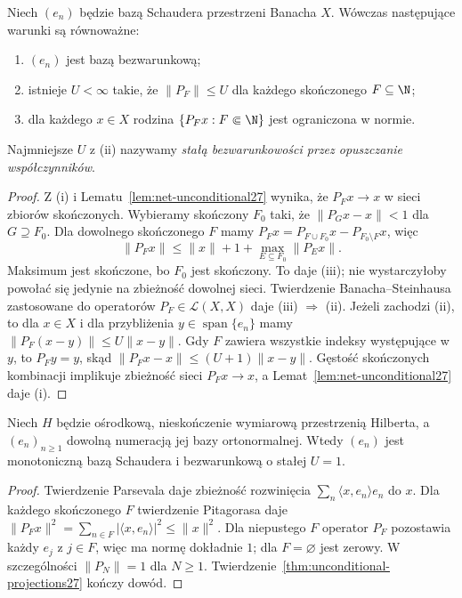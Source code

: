 \begin{twierdzenie}
\label{thm:unconditional-projections27}
Niech $(e_n)$ będzie bazą Schaudera przestrzeni Banacha $X$.
Wówczas następujące warunki są równoważne:
\begin{enumerate}[label=\textup{(\roman*)}]
\item $(e_n)$ jest bazą bezwarunkową;
\item istnieje $U<\infty$ takie, że $\|P_F\|\le U$
 dla każdego skończonego $F\subseteq\N$;
\item dla każdego $x\in X$ rodzina
$\{P_Fx:F\Subset\N\}$ jest ograniczona w normie.
\end{enumerate}
Najmniejsze $U$ z (ii) nazywamy \emph{stałą bezwarunkowości
przez opuszczanie współczynników}.
\end{twierdzenie}
\begin{proof}
Z (i) i Lematu~\ref{lem:net-unconditional27} wynika, że
$P_Fx\to x$ w sieci zbiorów skończonych. Wybieramy skończony
$F_0$ taki, że $\|P_Gx-x\|<1$ dla $G\supseteq F_0$.
Dla dowolnego skończonego $F$ mamy
$P_Fx=P_{F\cup F_0}x-P_{F_0\setminus F}x$,
więc
\[
\|P_Fx\|\le \|x\|+1+\max_{E\subseteq F_0}\|P_Ex\|.
\]
Maksimum jest skończone, bo $F_0$ jest skończony.
To daje (iii); nie wystarczyłoby powołać się jedynie na
zbieżność dowolnej sieci.
Twierdzenie Banacha--Steinhausa zastosowane do operatorów
$P_F\in\mathcal L(X,X)$ daje (iii) $\Rightarrow$ (ii).
Jeżeli zachodzi (ii), to dla $x\in X$ i dla przybliżenia
$y\in\operatorname{span}\{e_n\}$ mamy
$\|P_F(x-y)\|\le U\|x-y\|$.
Gdy $F$ zawiera wszystkie indeksy występujące w $y$,
to $P_Fy=y$, skąd $\|P_Fx-x\|\le(U+1)\|x-y\|$.
Gęstość skończonych kombinacji implikuje zbieżność
sieci $P_Fx\to x$, a Lemat~\ref{lem:net-unconditional27}
daje (i).
\end{proof}

\begin{wniosek}
\label{cor:hilbert-unconditional27}
Niech $H$ będzie ośrodkową, nieskończenie wymiarową
przestrzenią Hilberta, a $(e_n)_{n\ge1}$ dowolną numeracją
jej bazy ortonormalnej. Wtedy $(e_n)$ jest monotoniczną
bazą Schaudera i bezwarunkową o stałej $U=1$.
\end{wniosek}
\begin{proof}
Twierdzenie Parsevala daje zbieżność rozwinięcia
$\sum_n\langle x,e_n\rangle e_n$ do $x$.
Dla każdego skończonego $F$ twierdzenie Pitagorasa
daje $\|P_Fx\|^2=\sum_{n\in F}|\langle x,e_n\rangle|^2
\le\|x\|^2$. Dla niepustego $F$ operator $P_F$ pozostawia każdy $e_j$ z $j\in F$,
więc ma normę dokładnie $1$; dla $F=\varnothing$ jest zerowy.
W szczególności $\|P_N\|=1$ dla $N\ge1$.
Twierdzenie~\ref{thm:unconditional-projections27} kończy dowód.
\end{proof}

